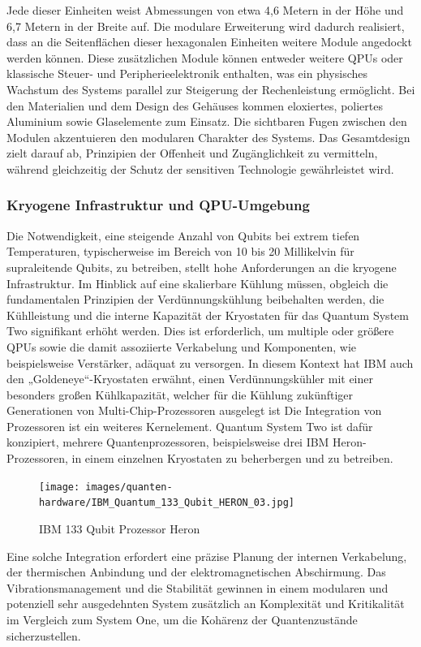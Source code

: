 Jede dieser Einheiten weist Abmessungen von etwa 4,6 Metern in der Höhe und 6,7 Metern in der Breite auf. Die modulare Erweiterung wird dadurch realisiert, dass an die Seitenflächen dieser hexagonalen Einheiten weitere Module angedockt werden können. Diese zusätzlichen Module können entweder weitere QPUs oder klassische Steuer- und Peripherieelektronik enthalten, was ein physisches Wachstum des Systems parallel zur Steigerung der Rechenleistung ermöglicht. Bei den Materialien und dem Design des Gehäuses kommen eloxiertes, poliertes Aluminium sowie Glaselemente zum Einsatz. Die sichtbaren Fugen zwischen den Modulen akzentuieren den modularen Charakter des Systems.
Das Gesamtdesign zielt darauf ab, Prinzipien der Offenheit und Zugänglichkeit zu vermitteln, während gleichzeitig der Schutz der sensitiven Technologie gewährleistet wird.

\subsubsection{Kryogene Infrastruktur und QPU-Umgebung}
Die Notwendigkeit, eine steigende Anzahl von Qubits bei extrem tiefen Temperaturen, typischerweise im Bereich von 10 bis 20 Millikelvin für supraleitende Qubits, zu betreiben, stellt hohe Anforderungen an die kryogene Infrastruktur. Im Hinblick auf eine skalierbare Kühlung müssen, obgleich die fundamentalen Prinzipien der Verdünnungskühlung beibehalten werden, die Kühlleistung und die interne Kapazität der Kryostaten für das Quantum System Two signifikant erhöht werden. 
Dies ist erforderlich, um multiple oder größere QPUs sowie die damit assoziierte Verkabelung und Komponenten, wie beispielsweise Verstärker, adäquat zu versorgen. In diesem Kontext hat IBM auch den „Goldeneye“-Kryostaten erwähnt, einen Verdünnungskühler mit einer besonders großen Kühlkapazität, welcher für die Kühlung zukünftiger Generationen von Multi-Chip-Prozessoren ausgelegt ist %
Die Integration von Prozessoren ist ein weiteres Kernelement. Quantum System Two ist dafür konzipiert, mehrere Quantenprozessoren, beispielsweise drei IBM Heron-Prozessoren, in einem einzelnen Kryostaten zu beherbergen und zu betreiben.

\begin{figure}[H]
    \centering
    \texttt{[image: images/quanten-hardware/IBM\_Quantum\_133\_Qubit\_HERON\_03.jpg]}
    \caption{IBM 133 Qubit Prozessor Heron}
    \label{fig:ibmheron}
\end{figure}
Eine solche Integration erfordert eine präzise Planung der internen Verkabelung, der thermischen Anbindung und der elektromagnetischen Abschirmung. Das Vibrationsmanagement und die Stabilität gewinnen in einem modularen und potenziell sehr ausgedehnten System zusätzlich an Komplexität und Kritikalität im Vergleich zum System One, um die Kohärenz der Quantenzustände sicherzustellen.

